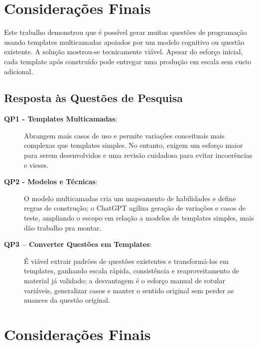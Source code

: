 \chapter{Considerações Finais}

Este trabalho demonstrou que é possível gerar muitas questões de programação usando templates multicamadas apoiados por um modelo cognitivo ou questão existente. A solução mostrou-se tecnicamente viável. Apesar do esforço inicial, cada template após construído pode entregar uma produção em escala sem custo adicional. 

\section{Resposta às Questões de Pesquisa }

\begin{description}
    \item[\textbf{QP1 - Templates Multicamadas}:] Abrangem mais casos de uso e permite variações conceituais mais complexas que templates simples. No entanto, exigem um esforço maior para serem desenvolvidos e uma revisão cuidadosa para evitar incoerências e vieses.
    \item[\textbf{QP2 - Modelos e Técnicas}:] O modelo multicamadas cria um mapeamento de habilidades e define regras de construção; o ChatGPT agiliza geração de variações e casos de teste, ampliando o escopo em relação a modelos de templates simples, mais dão trabalho pra montar.
    \item[\textbf{QP3 – Converter Questões em Templates}:] É viável extrair padrões de questões existentes e transformá-los em templates, ganhando escala rápida, consistência e reaproveitamento de material já validado; a desvantagem é o esforço manual de rotular variáveis, generalizar casos e manter o sentido original sem perder as nuances da questão original.    
\end{description}




\chapter{Considerações Finais}

